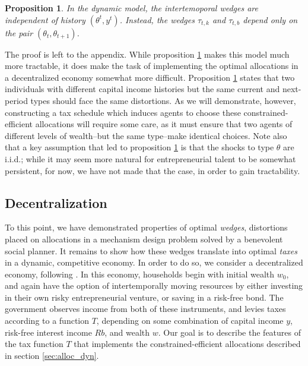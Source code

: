 \documentclass[11pt]{article}
\newtheorem{proposition}{Proposition}
\begin{document}
\begin{proposition} \label{prop:wedge_indep}
    In the dynamic model, the intertemoporal wedges are independent of history \( \left( \theta^t, y^t \right) \). Instead, the wedges \( \tau_{t,k} \) and \( \tau_{t,b} \) depend only on the pair \( \left( \theta_t,\theta_{t+1} \right) \). 
\end{proposition}

The proof is left to the appendix. While proposition \ref{prop:wedge_indep} makes this model much more tractable, it does make the task of implementing the optimal allocations in a decentralized economy somewhat more difficult. Proposition \ref{prop:wedge_indep} states that two individuals with different capital income histories but the same current and next-period types should face the same distortions. As we will demonstrate, however, constructing a tax schedule which induces agents to choose these constrained-efficient allocations will require some care, as it must ensure that two agents of different levels of wealth--but the same type--make identical choices. Note also that a key assumption that led to proposition \ref{prop:wedge_indep} is that the shocks to type \( \theta \) are i.i.d.; while it may seem more natural for entrepreneurial talent to be somewhat persistent, for now, we have not made that the case, in order to gain tractability. 

\subsection{Decentralization} \label{sec:decent}
To this point, we have demonstrated properties of optimal \textit{wedges}, distortions placed on allocations in a mechanism design problem solved by a benevolent social planner. It remains to show how these wedges translate into optimal \textit{taxes} in a dynamic, competitive economy. In order to do so, we consider a decentralized economy, following \cite{benhabib2011distribution}. In this economy, households begin with initial wealth \( w_0 \), and again have the option of intertemporally moving resources by either investing in their own risky entrepreneurial venture, or saving in a risk-free bond. The government observes income from both of these instruments, and levies taxes according to a function \( T \), depending on some combination of capital income \( y \), risk-free interest income \( Rb \), and wealth \( w \). Our goal is to describe the features of the tax function \( T \) that implements the constrained-efficient allocations described in section \ref{sec:alloc_dyn}.
\end{document}
